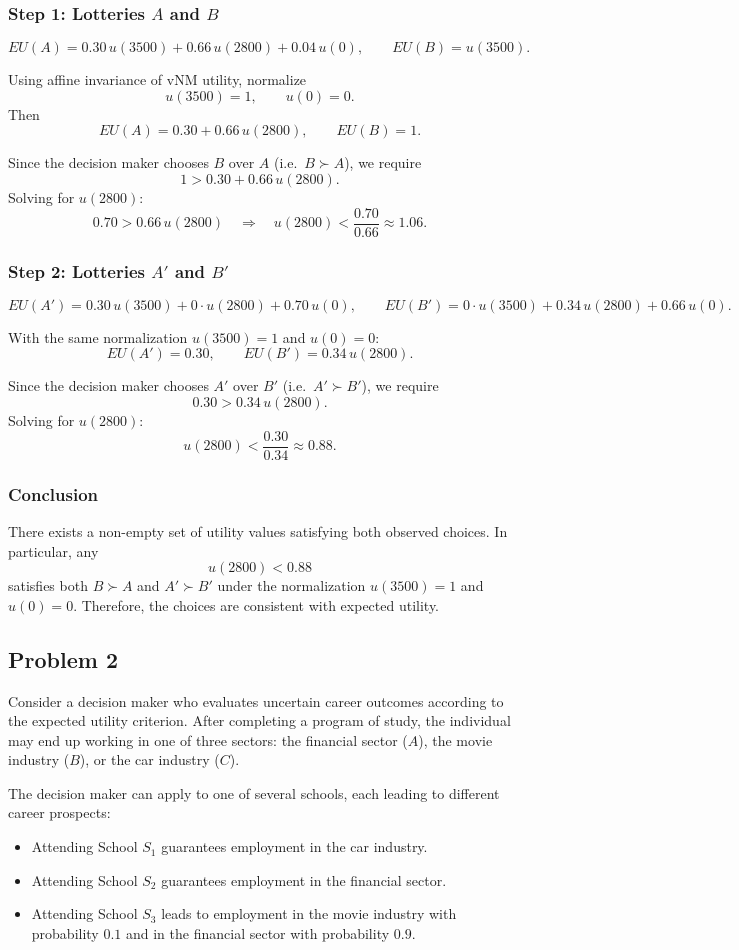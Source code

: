 \documentclass[12pt]{article}
\begin{document}
\subsubsection*{Step 1: Lotteries $A$ and $B$}
\[
EU(A)=0.30\,u(3500)+0.66\,u(2800)+0.04\,u(0),
\qquad
EU(B)=u(3500).
\]

Using affine invariance of vNM utility, normalize
\[
u(3500)=1,
\qquad
u(0)=0.
\]
Then
\[
EU(A)=0.30+0.66\,u(2800),
\qquad
EU(B)=1.
\]

Since the decision maker chooses $B$ over $A$ (i.e.\ $B \succ A$), we require
\[
1 > 0.30 + 0.66\,u(2800).
\]
Solving for $u(2800)$:
\[
0.70 > 0.66\,u(2800)
\quad\Longrightarrow\quad
u(2800) < \frac{0.70}{0.66}\approx 1.06.
\]

\subsubsection*{Step 2: Lotteries $A'$ and $B'$}
\[
EU(A')=0.30\,u(3500)+0\cdot u(2800)+0.70\,u(0),
\qquad
EU(B')=0\cdot u(3500)+0.34\,u(2800)+0.66\,u(0).
\]

With the same normalization $u(3500)=1$ and $u(0)=0$:
\[
EU(A')=0.30,
\qquad
EU(B')=0.34\,u(2800).
\]

Since the decision maker chooses $A'$ over $B'$ (i.e.\ $A' \succ B'$), we require
\[
0.30 > 0.34\,u(2800).
\]
Solving for $u(2800)$:
\[
u(2800) < \frac{0.30}{0.34}\approx 0.88.
\]

\subsubsection*{Conclusion}
There exists a non-empty set of utility values satisfying both observed choices. In particular, any
\[
u(2800) < 0.88
\]
satisfies both $B \succ A$ and $A' \succ B'$ under the normalization $u(3500)=1$ and $u(0)=0$.
Therefore, the choices are consistent with expected utility.

\newpage

\subsection*{Problem 2}
Consider a decision maker who evaluates uncertain career outcomes according to the expected utility criterion. After completing a program of study, the individual may end up working in one of three sectors:
the financial sector ($A$), the movie industry ($B$), or the car industry ($C$).

The decision maker can apply to one of several schools, each leading to different career prospects:
\begin{itemize}
\item Attending School $S_1$ guarantees employment in the car industry.
\item Attending School $S_2$ guarantees employment in the financial sector.
\item Attending School $S_3$ leads to employment in the movie industry with probability $0.1$ and in the financial sector with probability $0.9$.
\end{itemize}
\end{document}
